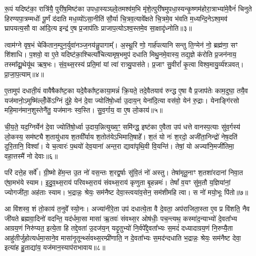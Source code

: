 रू॒पं यदिष्ट॑का॒ रात्रि॑यै॒ पुरी॑ष॒मिष्ट॑का उपधा॒स्यञ्छ्वे॒तमश्व॑म॒भि मृ॑शे॒त्पुरी॑षमुपधा॒स्यन्कृ॒ष्णम॑होरा॒त्राभ्या॑मे॒वैनं॑ चिनुते हिरण्यपा॒त्रम्मधोः᳚ पू॒र्णं द॑दाति मध॒व्यो॑\-ऽसा॒नीति॑ सौ॒र्या चि॒त्रव॒त्यावे᳚क्षते चि॒त्रमे॒व भ॑वति म॒ध्यन्दि॒ने\-ऽश्व॒मव॑ घ्रापयत्य॒सौ वा आ॑दि॒त्य इन्द्र॑ ए॒ष प्र॒जाप॑तिः प्राजाप॒त्यो\-ऽश्व॒स्तमे॒व सा॒क्षादृ॑ध्नोति॥३॥

{}

त्वाम॑ग्ने वृष॒भं चेकि॑तान॒म्पुन॒र्युवा॑नञ्ज॒नय॑न्नु॒पागाम्᳚। अ॒स्थू॒रि णो॒ गार्\mbox{}ह॑पत्यानि सन्तु ति॒ग्मेन॑ नो॒ ब्रह्म॑णा॒ सꣳ शि॑शाधि। प॒शवो॒ वा ए॒ते यदिष्ट॑का॒श्चित्यां᳚चित्यामृष॒भमुप॑ दधाति मिथु॒नमे॒वास्य॒ तद्य॒ज्ञे क॑रोति प्र॒जन॑नाय॒ तस्मा᳚द्यू॒थेयू॑थ ऋष॒भः। सं॒व॒थ्स॒रस्य॑ प्रति॒मां यां त्वा॑ रात्र्यु॒पास॑ते। प्र॒जाꣳ सु॒वीरां᳚ कृ॒त्वा विश्व॒मायु॒र्व्य॑श्ञवत्। प्रा॒जा॒प॒त्याम्॥४॥

ए॒तामुप॑ दधाती॒यं वावैषैका᳚ष्ट॒का यदे॒वैका᳚ष्ट॒काया॒मन्नं॑ क्रि॒यते॒ तदे॒वैतयाव॑ रुन्द्ध ए॒षा वै प्र॒जाप॑तेः काम॒दुघा॒ तयै॒व यज॑मानो॒\-ऽमुष्मि॑ल्लोँ॒के᳚\-ऽग्निं दु॑हे॒ येन॑ दे॒वा ज्योति॑षो॒र्ध्वा उ॒दाय॒न् येना॑दि॒त्या वस॑वो॒ येन॑ रु॒द्राः। येनाङ्गि॑रसो महि॒मान॑मान॒शुस्तेनै॑तु॒ यज॑मानः स्व॒स्ति। सु॒व॒र्गाय॒ वा ए॒ष लो॒काय॑॥५॥

ची॒य॒ते॒ यद॒ग्निर्येन॑ दे॒वा ज्योति॑षो॒र्ध्वा उ॒दाय॒न्नित्युख्य॒ꣳ॒ समि॑न्द्ध॒ इष्ट॑का ए॒वैता उप॑ धत्ते वानस्प॒त्याः सु॑व॒र्गस्य॑ लो॒कस्य॒ सम॑ष्ट्यै श॒तायु॑धाय श॒तवी᳚र्याय श॒तोत॑ये\-ऽभिमाति॒षाहे᳚। श॒तं यो नः॑ श॒रदो॒ अजी॑ता॒निन्द्रो॑ नेष॒दति॑ दुरि॒तानि॒ विश्वा᳚। ये च॒त्वारः॑ प॒थयो॑ देव॒याना॑ अन्त॒रा द्यावा॑पृथि॒वी वि॒यन्ति॑। तेषां॒ यो अज्या॑नि॒मजी॑तिमा॒ वहा॒त्तस्मै॑ नो देवाः॥६॥

परि॑ दत्ते॒ह सर्वे᳚। ग्री॒ष्मो हे॑म॒न्त उ॒त नो॑ वस॒न्तः श॒रद्व॒र्\mbox{}षाः सु॑वि॒तं नो॑ अस्तु। तेषा॑मृतू॒नाꣳ श॒तशा॑रदानां निवा॒त ए॑षा॒मभ॑ये स्याम। इ॒दु॒व॒थ्स॒राय॑ परिवथ्स॒राय॑ संवथ्स॒राय॑ कृणुता बृ॒हन्नमः॑। तेषां᳚ व॒यꣳ सु॑म॒तौ य॒ज्ञिया॑नां॒ ज्योगजी॑ता॒ अह॑ताः स्याम। भ॒द्रान्नः॒ श्रेयः॒ सम॑नैष्ट देवा॒स्त्वया॑व॒सेन॒ सम॑शीमहि त्वा। स नो॑ मयो॒भूः पि॑तो॥७॥

आ वि॑शस्व॒ शं तो॒काय॑ त॒नुवे᳚ स्यो॒नः। अज्या॑नीरे॒ता उप॑ दधात्ये॒ता वै दे॒वता॒ अप॑राजिता॒स्ता ए॒व प्र वि॑शति॒ नैव जी॑यते ब्रह्मवा॒दिनो॑ वदन्ति॒ यद॑र्धमा॒सा मासा॑ ऋ॒तवः॑ संवथ्स॒र ओष॑धीः॒ पच॒न्त्यथ॒ कस्मा॑द॒न्याभ्यो॑ दे॒वता᳚भ्य आग्रय॒णं निरु॑प्यत॒ इत्ये॒ता हि तद्दे॒वता॑ उ॒दज॑य॒न् यदृ॒तुभ्यो॑ नि॒र्वपे᳚द्दे॒वता᳚भ्यः स॒मदं॑ दध्यादाग्रय॒णं नि॒रुप्यै॒ता आहु॑तीर्जुहोत्यर्धमा॒साने॒व मासा॑नृ॒तून्थ्सं॑वथ्स॒रम्प्री॑णाति॒ न दे॒वता᳚भ्यः स॒मद॑न्दधाति भ॒द्रान्नः॒ श्रेयः॒ सम॑नैष्ट देवा॒ इत्या॑ह हु॒ताद्या॑य॒ यज॑मान॒स्याप॑राभावाय॥८॥


